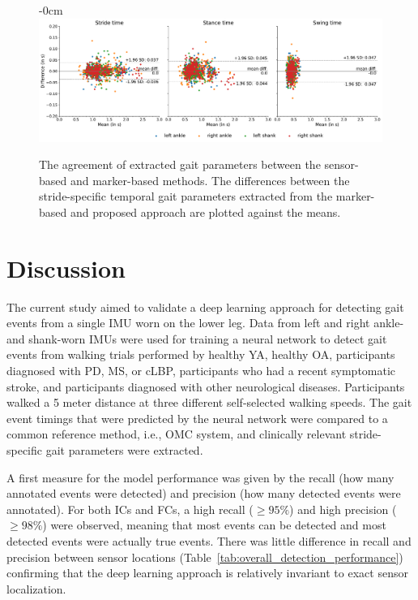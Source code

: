 \documentclass[sensors,article,submit,pdftex,moreauthors]{Definitions/mdpi}
\begin{document}
\begin{figure}[H]
	\begin{adjustwidth}{-\extralength}{0cm}
		\centering
		\includegraphics[width=18.5cm]{fig/bland_altman_plots_stride_params}
	\end{adjustwidth}
	\caption{The agreement of extracted gait parameters between the sensor-based and marker-based methods. The differences between the stride-specific temporal gait parameters extracted from the marker-based and proposed approach are plotted against the means. \label{fig:gait_parameters_bland_altman_plots}}
\end{figure}  


\section{Discussion}
The current study aimed to validate a deep learning approach for detecting gait events from a single IMU worn on the lower leg. Data from left and right ankle- and shank-worn IMUs were used for training a neural network to detect gait events from walking trials performed by healthy YA, healthy OA, participants diagnosed with PD, MS, or cLBP, participants who had a recent symptomatic stroke, and participants diagnosed with other neurological diseases. Participants walked a 5 meter distance at three different self-selected walking speeds. The gait event timings that were predicted by the neural network were compared to a common reference method, i.e., OMC system, and clinically relevant stride-specific gait parameters were extracted. 

A first measure for the model performance was given by the recall (how many annotated events were detected) and precision (how many detected events were annotated). For both ICs and FCs, a high recall ($\ge 95\%$) and high precision ($\ge 98\%$) were observed, meaning that most events can be detected and most detected events were actually true events. There was little difference in recall and precision between sensor locations (Table~\ref{tab:overall_detection_performance}) confirming that the deep learning approach is relatively invariant to exact sensor localization. 
\end{document}
